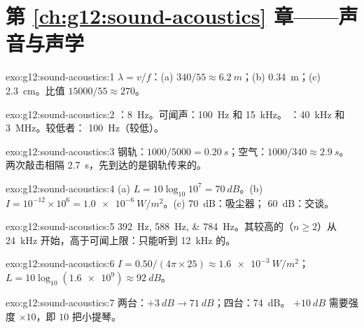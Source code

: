 \section*{第 \ref{ch:g12:sound-acoustics} 章——声音与声学}

\begin{solution}{exo:g12:sound-acoustics:1}
$\lambda = v/f$：(a) $340/55 \approx \qty{6.2}{m}$；(b)
\qty{0.34}{m}；(c) \qty{2.3}{cm}。比值 $15000/55 \approx 270$。
\end{solution}

\begin{solution}{exo:g12:sound-acoustics:2}
：\qty{8}{Hz}。可闻声：\qty{100}{Hz} 和 \qty{15}{kHz}。
：\qty{40}{kHz} 和 \qty{3}{MHz}。较低者：
\qty{100}{Hz}（较低）。
\end{solution}

\begin{solution}{exo:g12:sound-acoustics:3}
钢轨：$1000/5000 = \qty{0.20}{s}$；空气：$1000/340 \approx
\qty{2.9}{s}$。两次敲击相隔 \qty{2.7}{s}，先到达的是钢轨传来的。
\end{solution}

\begin{solution}{exo:g12:sound-acoustics:4}
(a) $L = 10\log_{10}10^{7} = \qty{70}{dB}$。(b) $I = 10^{-12} \times
10^{6} = \qty{1.0e-6}{W/m^2}$。(c) \qty{70}{dB}：吸尘器；
\qty{60}{dB}：交谈。
\end{solution}

\begin{solution}{exo:g12:sound-acoustics:5}
\qtylist{392;588;784}{Hz}。其较高的（$n \ge 2$）从
\qty{24}{kHz} 开始，高于可闻上限：只能听到 \qty{12}{kHz}
的。
\end{solution}

\begin{solution}{exo:g12:sound-acoustics:6}
$I = 0.50/(4\pi \times 25) \approx \qty{1.6e-3}{W/m^2}$；
$L = 10\log_{10}(\num{1.6e9}) \approx \qty{92}{dB}$。
\end{solution}

\begin{solution}{exo:g12:sound-acoustics:7}
两台：$+\qty{3}{dB} \to \qty{71}{dB}$；四台：\qty{74}{dB}。
$+\qty{10}{dB}$ 需要强度 $\times 10$，即 $10$ 把小提琴。
\end{solution}

